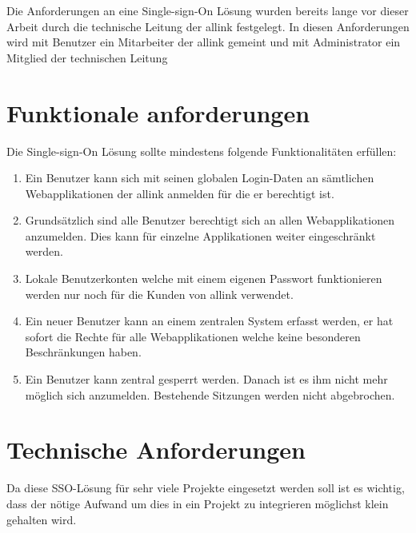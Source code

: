 Die Anforderungen an eine Single-sign-On Lösung wurden bereits lange vor dieser Arbeit durch die technische Leitung der allink festgelegt. In diesen Anforderungen wird mit Benutzer ein Mitarbeiter der allink gemeint und mit Administrator ein Mitglied der technischen Leitung

\section{Funktionale anforderungen}
\label{sec:funktionale_anforderungen}
Die Single-sign-On Lösung sollte mindestens folgende Funktionalitäten erfüllen:
\begin{enumerate}
  \item Ein Benutzer kann sich mit seinen globalen Login-Daten an sämtlichen Webapplikationen der allink anmelden für die er berechtigt ist.
  \item Grundsätzlich sind alle Benutzer berechtigt sich an allen Webapplikationen anzumelden. Dies kann für einzelne Applikationen weiter eingeschränkt werden.
  \item Lokale Benutzerkonten welche mit einem eigenen Passwort funktionieren werden nur noch für die Kunden von allink verwendet.
  \item Ein neuer Benutzer kann an einem zentralen System erfasst werden, er hat sofort die Rechte für alle Webapplikationen welche keine besonderen Beschränkungen haben.
  \item Ein Benutzer kann zentral gesperrt werden. Danach ist es ihm nicht mehr möglich sich anzumelden. Bestehende Sitzungen werden nicht abgebrochen.
\end{enumerate}

\section{Technische Anforderungen}
\label{sec:technische_anforderungen}
Da diese SSO-Lösung für sehr viele Projekte eingesetzt werden soll ist es wichtig, dass der nötige Aufwand um dies in ein Projekt zu integrieren möglichst klein gehalten wird.